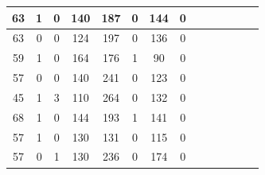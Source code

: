 \documentclass{article}
\begin{document}
\begin{center}
\begin{longtable}{|c|c|c|c|c|c|c|c|c|c|c|c|c|c|}
\hline
63 & 1 & 0 & 140 & 187 & 0 & 144 & 0 \\
\hline
63 & 0 & 0 & 124 & 197 & 0 & 136 & 0 \\
\hline
59 & 1 & 0 & 164 & 176 & 1 & 90 & 0 \\
\hline
57 & 0 & 0 & 140 & 241 & 0 & 123 & 0 \\
\hline
45 & 1 & 3 & 110 & 264 & 0 & 132 & 0 \\
\hline
68 & 1 & 0 & 144 & 193 & 1 & 141 & 0 \\
\hline
57 & 1 & 0 & 130 & 131 & 0 & 115 & 0 \\
\hline
57 & 0 & 1 & 130 & 236 & 0 & 174 & 0 \\
\hline
\end{longtable}
\end{center}
\end{document}
